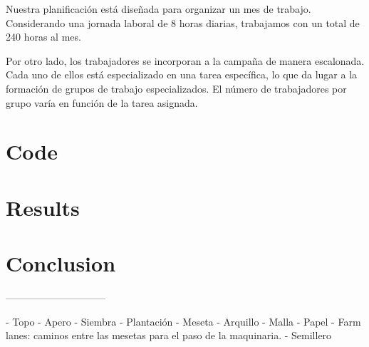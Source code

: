 Nuestra planificación está diseñada para organizar un mes de trabajo. Considerando una jornada laboral de 8 horas diarias, 
trabajamos con un total de 240 horas al mes.

Por otro lado, los trabajadores se incorporan a la campaña de manera escalonada. Cada uno de ellos está especializado en una 
tarea específica, lo que da lugar a la formación de grupos de trabajo especializados. El número de trabajadores por grupo varía 
en función de la tarea asignada.



\chapter*{Code}

\chapter*{Results}

\chapter*{Conclusion}


\newpage
------------------------------

- Topo
- Apero
- Siembra
- Plantación
- Meseta
- Arquillo
- Malla
- Papel
- Farm lanes: caminos entre las mesetas para el paso de la maquinaria.
- Semillero
